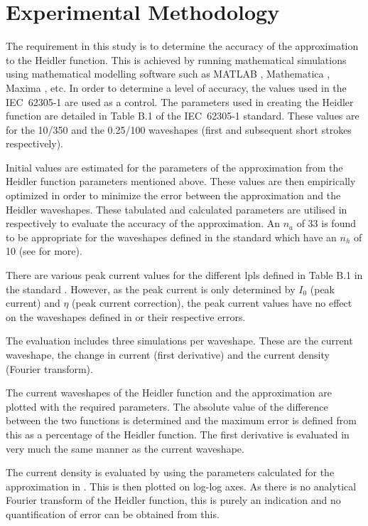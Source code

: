 \section{Experimental Methodology}
\label{sec:results_experimental_methodology}
The requirement in this study is to determine the accuracy of the approximation to the Heidler function. This is achieved by running mathematical simulations using mathematical modelling software such as MATLAB\textsuperscript{\textregistered} \cite{MATLAB}, Mathematica\textsuperscript{\textregistered} \cite{mathematica}, Maxima \cite{maxima}, etc. In order to determine a level of accuracy, the values used in the IEC~62305-1 are used as a control. The parameters used in creating the Heidler function are detailed in Table B.1 of the IEC~62305-1 standard. These values are for the 10/350 and the 0.25/100 waveshapes (first and subsequent short strokes respectively).

Initial values are estimated for the parameters of the approximation from the Heidler function parameters mentioned above. These values are then empirically optimized in order to minimize the error between the approximation and the Heidler waveshapes. These tabulated and calculated parameters are utilised in  respectively to evaluate the accuracy of the approximation. An $n_a$ of 33 is found to be appropriate for the waveshapes defined in the standard which have an $n_h$ of 10 (see  for more).

There are various peak current values for the different \glspl{lpl} defined in Table B.1 in the standard \cite{IEC623051}. However, as the peak current is only determined by $I_0$ (peak current) and $\eta$ (peak current correction), the peak current values have no effect on the waveshapes defined in  or their respective errors.

The evaluation includes three simulations per waveshape. These are the current waveshape, the change in current (first derivative) and the current density (Fourier transform).

The current waveshapes of the Heidler function and the approximation are plotted with the required parameters. The absolute value of the difference between the two functions is determined and the maximum error is defined from this as a percentage of the Heidler function. The first derivative is evaluated in very much the same manner as the current waveshape.

The current density is evaluated by using the parameters calculated for the approximation in . This is then plotted on log-log axes. As there is no analytical Fourier transform of the Heidler function, this is purely an indication and no quantification of error can be obtained from this.

